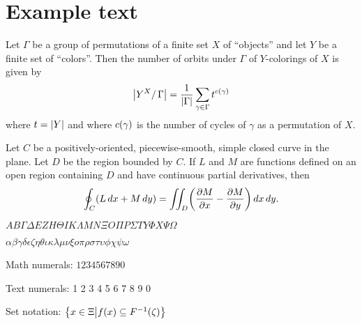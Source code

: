 \section*{Example text}

\begin{theorem*}
  Let $\Gamma$ be a group of permutations of a finite set $X$ of ``objects'' and let $Y$ be a finite set of ``colors''.
  Then the number of orbits under $\Gamma$ of $Y$-colorings of $X$ is given by
  \begin{equation*}
    \abs*{Y^{X} / \, \Gamma} = \frac{1}{\abs{\Gamma}} \sum_{\gamma \in \Gamma} t^{c \pbrac{\gamma}}
  \end{equation*}
  where $t = \abs{Y}$ and where $c \pbrac{\gamma}$ is the number of cycles of $\gamma$ as a permutation of $X$.
\end{theorem*}

\begin{theorem*}
  Let $C$ be a positively-oriented, piecewise-smooth, simple closed curve in the plane.
  Let $D$ be the region bounded by $C$.
  If $L$ and $M$ are functions defined on an open region containing $D$ and have continuous partial derivatives, then
  \begin{equation*}
    \oint_{C} \pbrac*{L \, d x + M \, d y} = \iint_{D} \pbrac*{\frac{\partial M}{\partial x} - \frac{\partial M}{\partial y}} \, dx \, d y.
  \end{equation*}
\end{theorem*}

$A B \Gamma \Delta E Z H \Theta I K \Lambda M N \Xi O \Pi P \Sigma T Y \Phi X \Psi \Omega$

$\alpha \beta \gamma \delta \epsilon \zeta \eta \theta \iota \kappa \lambda \mu \nu \xi o \pi \rho \sigma \tau \upsilon \phi \chi \psi \omega$

Math numerals:
$1 2 3 4 5 6 7 8 9 0$

Text numerals:
1 2 3 4 5 6 7 8 9 0

Set notation: $\cbrac*{x \in \Xi \middle\vert f(x) \subseteq F^{-1} (\zeta)}$